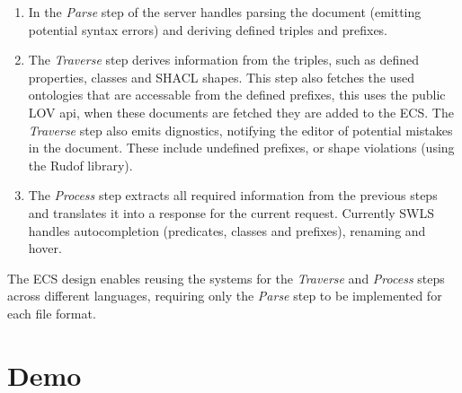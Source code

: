 \begin{enumerate}
  \item In the \textit{Parse} step of the server handles parsing the document (emitting potential syntax errors) and deriving defined triples and prefixes.

  \item The \textit{Traverse} step derives information from the triples, such as defined properties, classes and SHACL shapes. 
        This step also fetches the used ontologies that are accessable from the defined prefixes,
        this uses the public LOV api, when these documents are fetched they are added to the ECS.
        The \textit{Traverse} step also emits dignostics, notifying the editor of potential mistakes in the document. 
        These include undefined prefixes, or shape violations (using the Rudof\cite{labra2022rudof} library).

  \item The \textit{Process} step extracts all required information from the previous steps and translates it into a response for the current request.
        Currently SWLS handles autocompletion (predicates, classes and prefixes), renaming and hover.
\end{enumerate}
 
The ECS design enables reusing the systems for the \textit{Traverse} and \textit{Process} steps across different languages, 
requiring only the \textit{Parse} step to be implemented for each file format.

\section{Demo}

